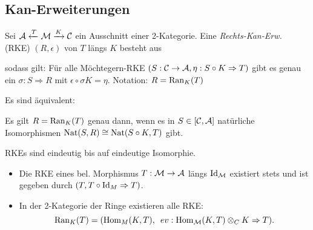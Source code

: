 \documentclass{cheat-sheet}
\newcommand{\ModC}{\mathcal{M}} %
\begin{document}
\vfill
\columnbreak

\subsection{Kan-Erweiterungen}

\begin{defn}
  Sei $\Aat \xleftarrow{T} \ModC \xrightarrow{K} \Cat$ ein Ausschnitt einer 2-Kategorie. Eine \emph{Rechts-Kan-Erw.} (RKE) $(R, \epsilon)$ von $T$ längs $K$ besteht aus
  \begin{itemize}
  \end{itemize}
  sodass gilt:
  Für alle Möchtegern-RKE $(S : \mathcal{C} \to \mathcal{A}, \eta : S \circ K \Rightarrow T)$ gibt es genau ein $\sigma : S \Rightarrow R$ mit $\epsilon \circ \sigma K = \eta$.
  Notation: $R = \operatorname{Ran}_K(T)$
\end{defn}

\begin{bem}
  Es sind äquivalent: \enspace
   \\
\end{bem}

\begin{bem}
  Es gilt $R = \operatorname{Ran}_K(T)$ genau dann, wenn es in $S \in [\mathcal{C}, \mathcal{A}]$ natürliche Isomorphismen
  $\operatorname{Nat}(S, R) \cong \operatorname{Nat}(S \circ K, T)$ gibt.
\end{bem}

\begin{prop}
  RKEs sind eindeutig bis auf eindeutige Isomorphie.
\end{prop}

\begin{bspe}
  \begin{itemize}
    \item Die RKE eines bel. Morphismus $T : \ModC \to \Aat$ längs $\Id_\ModC$ existiert stets und ist gegeben durch $(T, T \circ \operatorname{Id}_M \Rightarrow T)$.
    \item In der 2-Kategorie der Ringe existieren alle RKE:
    \[ \Ran_K(T) = (\Hom_M(K, T), \enspace ev : \Hom_\ModC(K, T) \otimes_C K \Rightarrow T). \]
  \end{itemize}
\end{bspe}
\end{document}
